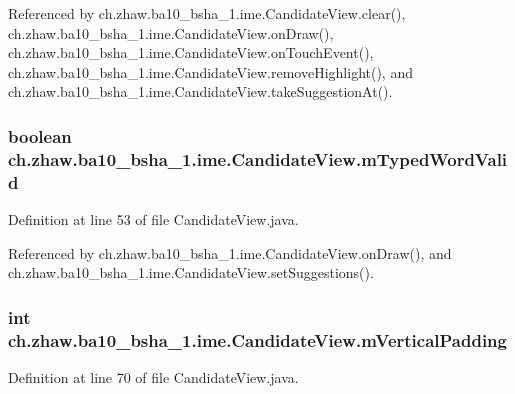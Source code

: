 Referenced by ch.zhaw.ba10\_\-bsha\_\-1.ime.CandidateView.clear(), ch.zhaw.ba10\_\-bsha\_\-1.ime.CandidateView.onDraw(), ch.zhaw.ba10\_\-bsha\_\-1.ime.CandidateView.onTouchEvent(), ch.zhaw.ba10\_\-bsha\_\-1.ime.CandidateView.removeHighlight(), and ch.zhaw.ba10\_\-bsha\_\-1.ime.CandidateView.takeSuggestionAt().\hypertarget{classch_1_1zhaw_1_1ba10__bsha__1_1_1ime_1_1CandidateView_a2283ffd5b861d5fa11e315f499b247f5}{
\subsubsection[{mTypedWordValid}]{\setlength{\rightskip}{0pt plus 5cm}boolean {\bf ch.zhaw.ba10\_\-bsha\_\-1.ime.CandidateView.mTypedWordValid}}}
\label{classch_1_1zhaw_1_1ba10__bsha__1_1_1ime_1_1CandidateView_a2283ffd5b861d5fa11e315f499b247f5}


Definition at line 53 of file CandidateView.java.

Referenced by ch.zhaw.ba10\_\-bsha\_\-1.ime.CandidateView.onDraw(), and ch.zhaw.ba10\_\-bsha\_\-1.ime.CandidateView.setSuggestions().\hypertarget{classch_1_1zhaw_1_1ba10__bsha__1_1_1ime_1_1CandidateView_a09be680d6c44ef69940000d2f784d6c1}{
\subsubsection[{mVerticalPadding}]{\setlength{\rightskip}{0pt plus 5cm}int {\bf ch.zhaw.ba10\_\-bsha\_\-1.ime.CandidateView.mVerticalPadding}}}
\label{classch_1_1zhaw_1_1ba10__bsha__1_1_1ime_1_1CandidateView_a09be680d6c44ef69940000d2f784d6c1}


Definition at line 70 of file CandidateView.java.

